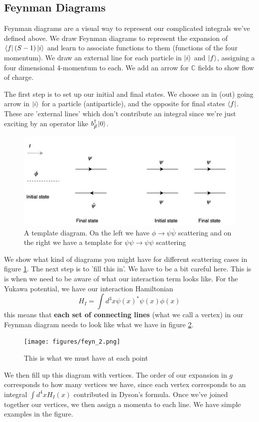 \subsection{Feynman Diagrams} 
Feynman diagrams are a visual way to represent 
our complicated integrals we've defined above. 
We draw Feynman diagrams to 
represent the expansion of $ \bra { f} ( S - 1) \ket{ i } $ and learn to 
associate functions to them (functions of the four momentum). 
We draw an external line for each particle in $ \ket{ i } $
and $ \ket{ f } $, assigning a four dimensional 
4-momentum to each. We add an arrow for  $ \mathbb{C} $  
fields to show flow of charge. 

The first step is to set up our 
initial and final states. 
We choose an in (out) going arrow in $ \ket{ i } $ for a 
particle (antiparticle), and the opposite for final states $ \bra { f} $. 
These are 'external lines' which don't contribute an integral 
since we're just exciting by an operator like $ b_{ \vec{p} } ^ \dagger \ket{ 0 } $. 

\begin{figure}[htpb]
\centering
\includegraphics[width=0.8\linewidth]{figures/feyn_1.jpg}
\caption{A template diagram. On the left we have $\phi \to \psi \overline{\psi}$ scattering 
and on the right we have a template for $ \psi \psi \to \psi \psi $ scattering}%
\label{fig:template Feyn}
\end{figure}

We show what kind of diagrams you might have 
for different scattering cases in figure \ref{fig:template Feyn}. 
The next step is to 'fill this in'. We have to be a bit 
careful here. This is is when we need to be aware of what our interaction term looks like. 
For the Yukawa potential, we have our interaction Hamiltonian 
\[
H_I  = \int d^ 3 x \psi ( x) ^ * \psi ( x) \phi ( x) 
\] this means that \textbf{each set of connecting lines} (what we 
call a vertex) in our Feynman diagram needs to look like what we have 
in figure \ref{fig:figures/feyn2}. 
\begin{figure}[htpb]
\centering
\hspace{3cm} \texttt{[image: figures/feyn\_2.png]}
\caption{This is what we must have at each point}%
\label{fig:figures/feyn2}
\end{figure}
We then fill up this diagram with vertices. 
The order of our expansion in $ g $ corresponds 
to how many vertices we have, since each vertex
corresponds to an integral $ \int d^ 4 x H_ I ( x ) $
contributed in Dyson's formula.
Once we've joined together our vertices, we then 
assign a momenta to each line. We have simple examples in the figure. 

